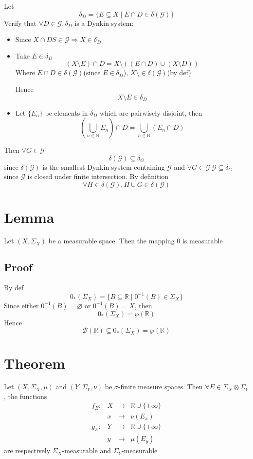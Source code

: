 \documentclass{book}
\begin{document}
Let $$\delta_D=\{E\subseteq X\mid E\cap D\in \delta(\mathcal{G})\}$$
Verify that $\forall D\in \mathcal{G},\delta_D$ is a Dynkin system:
\begin{itemize}
    \item Since $X\cap DS\in \mathcal{G}\Rightarrow X\in \delta_D$
    \item Take $E\in \delta_D$
    $$(X\setminus E)\cap D=X\setminus((E\cap D)\cup(X\setminus D))$$
    Where $E\cap D\in \delta(\mathcal{G})$(since $E\in \delta_D$), $X\setminus\in \delta(\mathcal{G})$(by def)

    Hence $$X\setminus E\in \delta_D$$
    \item Let $\{E_n\}$ be elements in $\delta_D$ which are pairwisely disjoint, then $$(\bigcup\limits_{n\in \mathbb{N}}E_n)\cap D=\bigcup\limits_{n\in \mathbb{N}}(E_n\cap D)$$
    
\end{itemize}
Then $\forall G\in \mathcal{G}$$$\delta(\mathcal{G})\subseteq\delta_G$$
    since $\delta(\mathcal{G})$ is the smallest Dynkin system containing $\mathcal{G}$ and $\forall G\in \mathcal{G}\ \mathcal{G}\subseteq\delta_G$ since $\mathcal{G}$ is closed under finite intersection. By definition$$\forall H\in \delta(\mathcal{G}), H\cup G\in\delta(\mathcal{G})$$
\section{Lemma}
Let $(X,\Sigma_X)$ be a measurable space. Then the mapping 0 is measurable
\subsection*{Proof}
By def $$0_*(\Sigma_X)=\{B\subseteq\mathbb{R}\mid 0^{-1}(B)\in \Sigma_X\}$$
Since either $0^{-1}(B)=\varnothing$ or $0^{-1}(B)=X$, then $$0_*(\Sigma_X)=\wp(\mathbb{R})$$
Hence $$\mathscr{B}(\mathbb{R})\subseteq 0_*(\Sigma_X)=\wp(\mathbb{R})$$
\section{Theorem}
Let $(X,\Sigma_X,\mu)$ and $(Y,\Sigma_Y,\nu)$ be $\sigma$-finite measure spaces. Then $\forall E\in \Sigma_X\otimes\Sigma_Y$, the functions
$$\begin{aligned}
    f_E: &X &\rightarrow &\mathbb{R}\cup\{+\infty\}\\ &x &\mapsto &\nu(E_x)\\
    g_E: &Y &\rightarrow &\mathbb{R}\cup\{+\infty\}\\ &y &\mapsto &\mu(E_y)
\end{aligned}$$
are respectively $\Sigma_X$-measurable and $\Sigma_Y$-measurable
\end{document}
